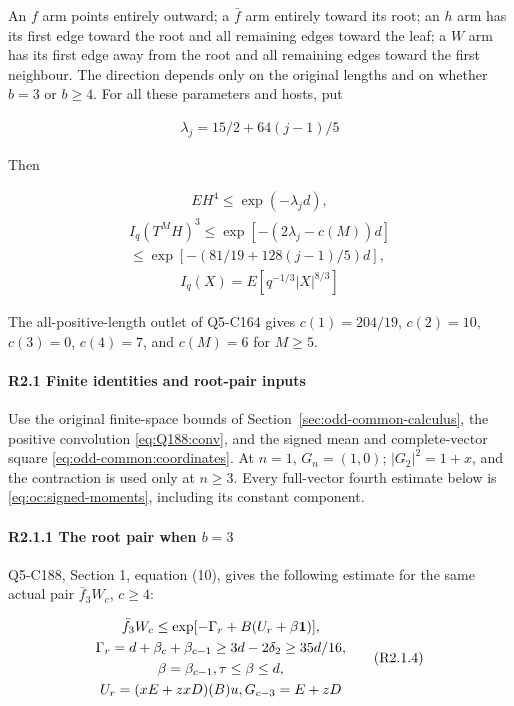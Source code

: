An \(f\) arm points entirely outward; a \(\bar f\) arm entirely toward its root; an \(h\) arm has its first edge toward the root and all remaining edges toward the leaf; a \(W\) arm has its first edge away from the root and all remaining edges toward the first neighbour. The direction depends only on the original lengths and on whether \(b=3\) or \(b\ge4\). For all these parameters and hosts, put

\[
\begin{gathered}
\lambda_j=15/2+64(j-1)/5
\end{gathered}
\]

Then

\[
\begin{gathered}
EH^4\le \exp(-\lambda_j d), 
\end{gathered}\tag{R2.0.1}
\]
\[
\begin{gathered}
I_q(T^M H)^3\le \exp[-(2\lambda_j-c(M))d]\\
\le \exp[-(81/19+128(j-1)/5)d], 
\end{gathered}\tag{R2.0.2}
\]
\[
\begin{gathered}
I_q(X)=E[q^{-1/3}|X|^{8/3}]
\end{gathered}
\]

The all-positive-length outlet of Q5-C164 gives \(c(1)=204/19\), \(c(2)=10\), \(c(3)=0\), \(c(4)=7\), and \(c(M)=6\) for \(M\ge5\).

\paragraph{R2.1 Finite identities and root-pair inputs}\label{part:R2.1}

Use the original finite-space bounds of Section~\ref{sec:odd-common-calculus},
the positive convolution \eqref{eq:Q188:conv}, and the signed mean and
complete-vector square \eqref{eq:odd-common:coordinates}.
At \(n=1\), \(G_n=(1,0)\); \(|G_2|^2=1+x\), and
the contraction is used only at \(n\ge3\).
Every full-vector fourth estimate below is
\eqref{eq:oc:signed-moments}, including its constant component.

\paragraph{R2.1.1 The root pair when \(b=3\)}

Q5-C188, Section 1, equation (10), gives the following estimate for the same actual pair \(\bar f_3W_c\), \(c\ge4\):

\[
\begin{gathered}
\bar f_3 W_c\le \exp[-\Gamma_r+B(U_r+\beta\mathbf1)],\\
\Gamma_r=d+\beta_c+\beta_{c-1}\ge 3d-2\delta_2\ge 35d/16,\\
\beta=\beta_{c-1},\tau\le \beta\le d,\\
U_r=(xE+zxD)(B)u,G_{c-3}=E+zD 
\end{gathered}\tag{R2.1.4}
\]

